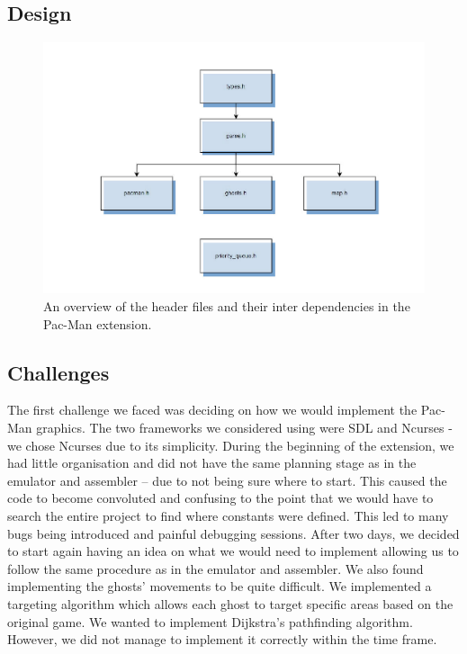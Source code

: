\documentclass{article}
\begin{document}
\clearpage


\subsection{Design}
\begin{figure}[h!]
\centering
\includegraphics[scale=0.9]{pacman-overviewStylized.JPG}
\caption{An overview of the header files and their inter dependencies in the Pac-Man extension.}
\end{figure}


\subsection{Challenges}
The first challenge we faced was deciding on how we would implement the Pac-Man graphics. The two frameworks we considered using were SDL and Ncurses - we chose Ncurses due to its simplicity. During the beginning of the extension, we had little organisation and did not have the same planning stage as in the emulator and assembler – due to not being sure where to start. This caused the code to become convoluted and confusing to the point that we would have to search the entire project to find where constants were defined. This led to many bugs being introduced and painful debugging sessions. After two days, we decided to start again having an idea on what we would need to implement allowing us to follow the same procedure as in the emulator and assembler. We also found implementing the ghosts’ movements to be quite difficult. We implemented a targeting algorithm which allows each ghost to target specific areas based on the original game. We wanted to implement Dijkstra’s pathfinding algorithm. However, we did not manage to implement it correctly within the time frame.
\end{document}
